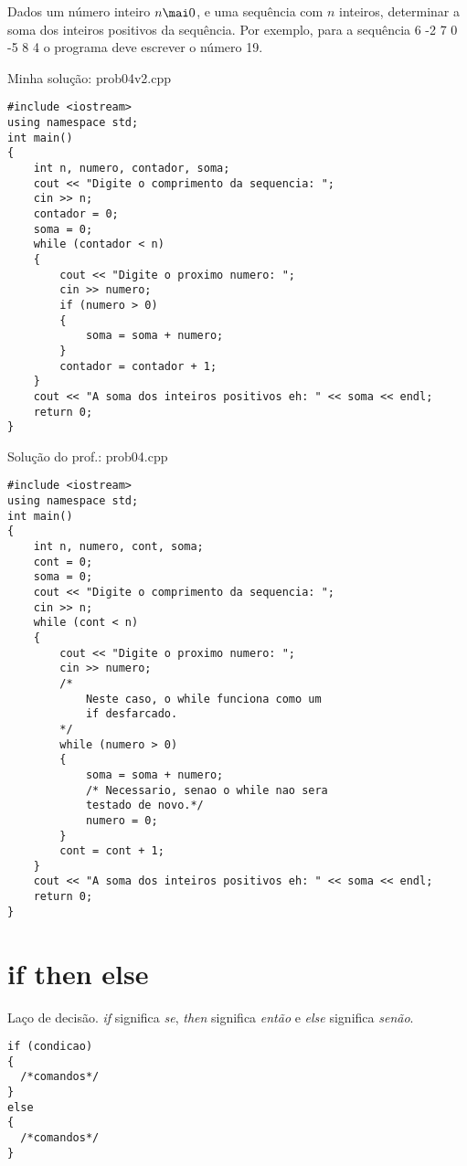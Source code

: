 \documentclass[a4paper]{memoir}
\begin{document}
\newpage

\begin{prob}\label{prob104.cpp}
Dados um número inteiro $n \mai 0$, e uma sequência com $n$ inteiros, determinar a soma dos inteiros positivos da sequência. Por exemplo, para a sequência 6 -2 7 0 -5 8 4 o programa deve escrever o número 19.
\end{prob}

\begin{sol}

Minha solução: prob04v2.cpp
\begin{lstlisting}
#include <iostream>
using namespace std;
int main()
{
    int n, numero, contador, soma;
    cout << "Digite o comprimento da sequencia: ";
    cin >> n;
    contador = 0;
    soma = 0;
    while (contador < n)
    {
        cout << "Digite o proximo numero: ";
        cin >> numero;
        if (numero > 0)
        {
            soma = soma + numero;
        }
        contador = contador + 1;
    }
    cout << "A soma dos inteiros positivos eh: " << soma << endl;
    return 0;
}
\end{lstlisting}

Solução do prof.: prob04.cpp
\begin{lstlisting}
#include <iostream>
using namespace std;
int main()
{
    int n, numero, cont, soma;
    cont = 0;
    soma = 0;
    cout << "Digite o comprimento da sequencia: ";
    cin >> n;
    while (cont < n)
    {
        cout << "Digite o proximo numero: ";
        cin >> numero;
        /*
            Neste caso, o while funciona como um
            if desfarcado.
        */
        while (numero > 0)
        {
            soma = soma + numero;
            /* Necessario, senao o while nao sera
            testado de novo.*/
            numero = 0;
        }
        cont = cont + 1;
    }
    cout << "A soma dos inteiros positivos eh: " << soma << endl;
    return 0;
}
\end{lstlisting}

\end{sol}

\section{if then else}

Laço de decisão. \emph{if} significa \emph{se}, \emph{then} significa \emph{então} e \emph{else} significa \emph{senão}.

\begin{lstlisting}
if (condicao)
{
  /*comandos*/
}
else
{
  /*comandos*/
}
\end{lstlisting}
\end{document}
